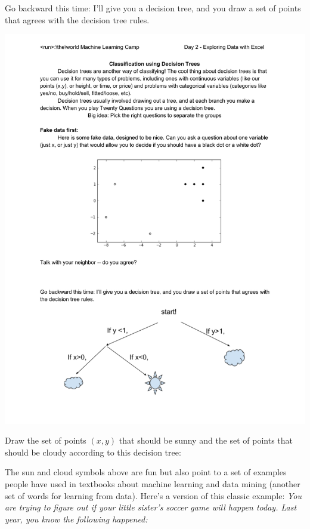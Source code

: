 \documentclass[10pt]{article}
\begin{document}
Go backward this time: I'll give you a decision tree, and you draw a set of points that agrees with the decision tree rules.
\begin{center}
\includegraphics{SunMoonDT.pdf}
\end{center}

Draw the set of points $(x,y)$ that should be sunny and the set of points that should be cloudy according to this decision tree:
\vfill

\pagebreak


The sun and cloud symbols above are fun but also point to a set of examples people have used in textbooks about machine learning and data mining (another set of words for learning from data). Here's a version of this classic example:
\textit{You are trying to figure out if your little sister's soccer game will happen today. Last year, you know the following happened:}
\end{document}
